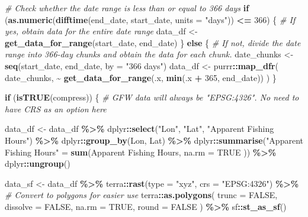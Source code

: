 \documentclass[
]{article}
\newenvironment{Shaded}{\begin{snugshade}}{\end{snugshade}}
\newcommand{\AttributeTok}[1]{\textcolor[rgb]{0.13,0.29,0.53}{#1}}
\newcommand{\CommentTok}[1]{\textcolor[rgb]{0.56,0.35,0.01}{\textit{#1}}}
\newcommand{\ConstantTok}[1]{\textcolor[rgb]{0.56,0.35,0.01}{#1}}
\newcommand{\ControlFlowTok}[1]{\textcolor[rgb]{0.13,0.29,0.53}{\textbf{#1}}}
\newcommand{\DecValTok}[1]{\textcolor[rgb]{0.00,0.00,0.81}{#1}}
\newcommand{\FunctionTok}[1]{\textcolor[rgb]{0.13,0.29,0.53}{\textbf{#1}}}
\newcommand{\NormalTok}[1]{#1}
\newcommand{\OtherTok}[1]{\textcolor[rgb]{0.56,0.35,0.01}{#1}}
\newcommand{\SpecialCharTok}[1]{\textcolor[rgb]{0.81,0.36,0.00}{\textbf{#1}}}
\newcommand{\StringTok}[1]{\textcolor[rgb]{0.31,0.60,0.02}{#1}}
\begin{document}
\begin{Shaded}
\begin{Highlighting}[]
  \CommentTok{\# Check whether the date range is less than or equal to 366 days}
  \ControlFlowTok{if}\NormalTok{ (}\FunctionTok{as.numeric}\NormalTok{(}\FunctionTok{difftime}\NormalTok{(end\_date, start\_date, }\AttributeTok{units =} \StringTok{"days"}\NormalTok{)) }\SpecialCharTok{\textless{}=} \DecValTok{366}\NormalTok{) \{}
    \CommentTok{\# If yes, obtain data for the entire date range}
\NormalTok{    data\_df }\OtherTok{\textless{}{-}} \FunctionTok{get\_data\_for\_range}\NormalTok{(start\_date, end\_date)}
\NormalTok{  \} }\ControlFlowTok{else}\NormalTok{ \{}
    \CommentTok{\# If not, divide the date range into 366{-}day chunks and obtain the data for each chunk.}
\NormalTok{    date\_chunks }\OtherTok{\textless{}{-}} \FunctionTok{seq}\NormalTok{(start\_date, end\_date, }\AttributeTok{by =} \StringTok{"366 days"}\NormalTok{)}
\NormalTok{    data\_df }\OtherTok{\textless{}{-}}\NormalTok{ purrr}\SpecialCharTok{::}\FunctionTok{map\_dfr}\NormalTok{(}
\NormalTok{      date\_chunks,}
      \SpecialCharTok{\textasciitilde{}} \FunctionTok{get\_data\_for\_range}\NormalTok{(.x, }\FunctionTok{min}\NormalTok{(.x }\SpecialCharTok{+} \DecValTok{365}\NormalTok{, end\_date))}
\NormalTok{    )}
\NormalTok{  \}}

  \ControlFlowTok{if}\NormalTok{ (}\FunctionTok{isTRUE}\NormalTok{(compress)) \{}
    \CommentTok{\# GFW data will always be "EPSG:4326". No need to have CRS as an option here}

\NormalTok{    data\_df }\OtherTok{\textless{}{-}}\NormalTok{ data\_df }\SpecialCharTok{\%\textgreater{}\%}
\NormalTok{      dplyr}\SpecialCharTok{::}\FunctionTok{select}\NormalTok{(}\StringTok{"Lon"}\NormalTok{, }\StringTok{"Lat"}\NormalTok{, }\StringTok{"Apparent Fishing Hours"}\NormalTok{) }\SpecialCharTok{\%\textgreater{}\%}
\NormalTok{      dplyr}\SpecialCharTok{::}\FunctionTok{group\_by}\NormalTok{(Lon, Lat) }\SpecialCharTok{\%\textgreater{}\%}
\NormalTok{      dplyr}\SpecialCharTok{::}\FunctionTok{summarise}\NormalTok{(}\StringTok{"Apparent Fishing Hours"} \OtherTok{=} \FunctionTok{sum}\NormalTok{(}\StringTok{\textasciigrave{}}\AttributeTok{Apparent Fishing Hours}\StringTok{\textasciigrave{}}\NormalTok{,}
        \AttributeTok{na.rm =} \ConstantTok{TRUE}
\NormalTok{      )) }\SpecialCharTok{\%\textgreater{}\%}
\NormalTok{      dplyr}\SpecialCharTok{::}\FunctionTok{ungroup}\NormalTok{()}

\NormalTok{    data\_sf }\OtherTok{\textless{}{-}}\NormalTok{ data\_df }\SpecialCharTok{\%\textgreater{}\%}
\NormalTok{      terra}\SpecialCharTok{::}\FunctionTok{rast}\NormalTok{(}\AttributeTok{type =} \StringTok{"xyz"}\NormalTok{, }\AttributeTok{crs =} \StringTok{"EPSG:4326"}\NormalTok{) }\SpecialCharTok{\%\textgreater{}\%} \CommentTok{\# Convert to polygons for easier use}
\NormalTok{      terra}\SpecialCharTok{::}\FunctionTok{as.polygons}\NormalTok{(}
        \AttributeTok{trunc =} \ConstantTok{FALSE}\NormalTok{,}
        \AttributeTok{dissolve =} \ConstantTok{FALSE}\NormalTok{,}
        \AttributeTok{na.rm =} \ConstantTok{TRUE}\NormalTok{,}
        \AttributeTok{round =} \ConstantTok{FALSE}
\NormalTok{      ) }\SpecialCharTok{\%\textgreater{}\%}
\NormalTok{      sf}\SpecialCharTok{::}\FunctionTok{st\_as\_sf}\NormalTok{()}


\end{Highlighting}
\end{Shaded}
\end{document}
